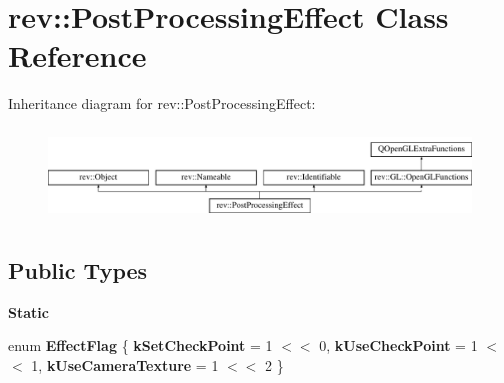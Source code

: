 \hypertarget{classrev_1_1_post_processing_effect}{}\section{rev\+::Post\+Processing\+Effect Class Reference}
\label{classrev_1_1_post_processing_effect}
Inheritance diagram for rev\+::Post\+Processing\+Effect\+:\begin{figure}[H]
\begin{center}
\leavevmode
\includegraphics[height=2.485207cm]{classrev_1_1_post_processing_effect}
\end{center}
\end{figure}
\subsection*{Public Types}
\begin{Indent}\textbf{ Static}\par
\begin{DoxyCompactItemize}
\item 
\mbox{\label{classrev_1_1_post_processing_effect_a287b64467204f25987588507efe3cee3}} 
enum {\bfseries Effect\+Flag} \{ {\bfseries k\+Set\+Check\+Point} = 1 $<$$<$ 0, 
{\bfseries k\+Use\+Check\+Point} = 1 $<$$<$ 1, 
{\bfseries k\+Use\+Camera\+Texture} = 1 $<$$<$ 2
 \}
\end{DoxyCompactItemize}
\end{Indent}
